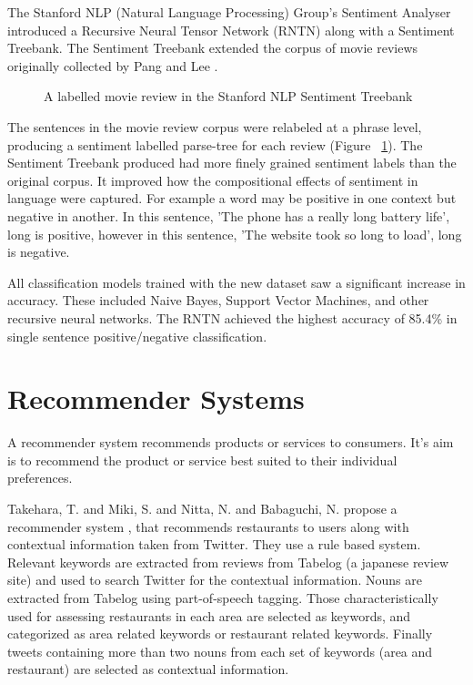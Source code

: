 The Stanford NLP (Natural Language Processing) Group's Sentiment Analyser \cite{stanfordSentiment2013} introduced a Recursive Neural Tensor Network (RNTN) along with a Sentiment Treebank. The Sentiment Treebank extended the corpus of movie reviews originally collected by Pang and Lee \cite{panglee2004}.
\begin{figure}
    \centering
    \setlength{\fboxsep}{0pt}
    \setlength{\fboxrule}{0.01pt}
    \setlength{\belowcaptionskip}{-10pt}
    \caption{A labelled movie review in the Stanford NLP Sentiment Treebank \cite{stanfordSentiment2013}}
    \label{fig:treebank}
\end{figure}
The sentences in the movie review corpus were relabeled at a phrase level, producing a sentiment labelled parse-tree for each review (Figure ~\ref{fig:treebank}). The Sentiment Treebank produced had more finely grained sentiment labels than the original corpus. It improved how the compositional effects of sentiment in language were captured. For example a word may be positive in one context but negative in another. In this sentence, 'The phone has a really long battery life', long is positive, however in this sentence, 'The website took so long to load', long is negative.

All classification models trained with the new dataset saw a significant increase in accuracy. These included Naive Bayes, Support Vector Machines, and other recursive neural networks. The RNTN achieved the highest accuracy of 85.4\% in single sentence positive/negative classification.

\section{Recommender Systems}

A recommender system recommends products or services to consumers. It's aim is to recommend the product or service best suited to their individual preferences.

Takehara, T. and Miki, S. and Nitta, N. and Babaguchi, N. propose a recommender system \cite{takeharaContext2012}, that recommends restaurants to users along with contextual information taken from Twitter. They use a rule based system. Relevant keywords are extracted from reviews from Tabelog (a japanese review site) and used to search Twitter for the contextual information. Nouns are extracted from Tabelog using part-of-speech tagging. Those characteristically used for assessing restaurants in each area are selected as keywords, and categorized as area related keywords or restaurant related keywords. Finally tweets containing more than two nouns from each set of keywords (area and restaurant) are selected as contextual information.


